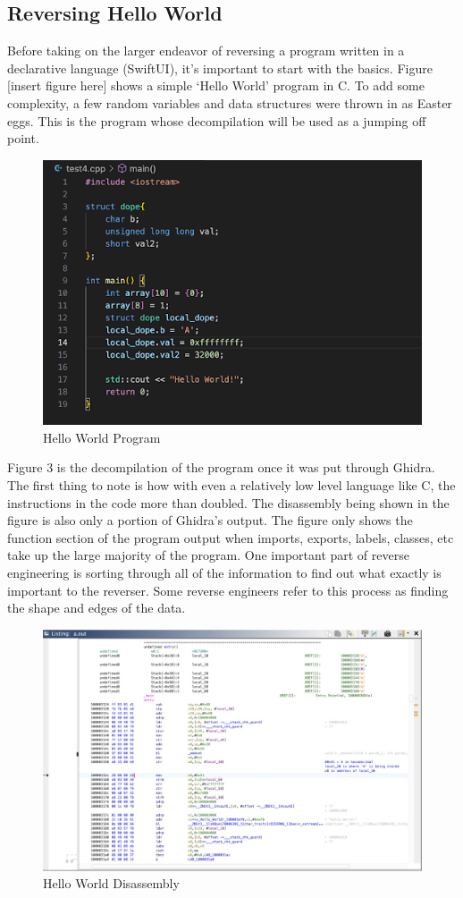 \subsection{Reversing Hello World}
Before taking on the larger endeavor of reversing a program written in a declarative language (SwiftUI), it’s important to start with the basics. 
Figure [insert figure here] shows a simple ‘Hello World’ program in C. 
To add some complexity, a few random variables and data structures were thrown in as Easter eggs. 
This is the program whose decompilation will be used as a jumping off point.
\begin{figure}[h]
	\caption{Hello World Program}
	\includegraphics[scale=.75]{HelloWorldSource.png}
\end{figure}
Figure 3 is the decompilation of the program once it was put through Ghidra. 
The first thing to note is how with even a relatively low level language like C, the instructions in the code more than doubled. 
The disassembly being shown in the figure is also only a portion of Ghidra’s output. 
The figure only shows the function section of the program output when imports, exports, labels, classes, etc take up the large majority of the program. 
One important part of reverse engineering is sorting through all of the information to find out what exactly is important to the reverser. 
Some reverse engineers refer to this process as finding the shape and edges of the data. 
\begin{figure}[h]
	\caption{Hello World Disassembly}
	\includegraphics[scale=.3]{HelloWorldGhidra.png}
\end{figure}
